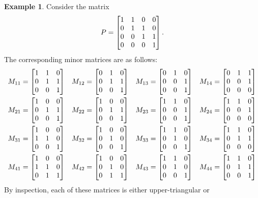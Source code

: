 \documentclass[reqno]{amsart}
\theoremstyle{definition}
\newtheorem{example}[theorem]{Example}
\begin{document}
\begin{example}\label{eg-adjugate-jordan}
 Consider the matrix
 \[ P = \left[\begin{matrix} 1&1&0&0 \\ 0&1&1&0 \\ 0&0&1&1 \\ 0&0&0&1 \end{matrix}\right]. \]
 The corresponding minor matrices are as follows:
 \begin{align*}
  M_{11} &= \left[\begin{matrix} 1&1&0\\ 0&1&1 \\ 0&0&1 \end{matrix}\right] &
  M_{12} &= \left[\begin{matrix} 0&1&0\\ 0&1&1 \\ 0&0&1 \end{matrix}\right] &
  M_{13} &= \left[\begin{matrix} 0&1&0\\ 0&0&1 \\ 0&0&1 \end{matrix}\right] &
  M_{14} &= \left[\begin{matrix} 0&1&1\\ 0&0&1 \\ 0&0&0 \end{matrix}\right] \\
  M_{21} &= \left[\begin{matrix} 1&0&0\\ 0&1&1 \\ 0&0&1 \end{matrix}\right] &
  M_{22} &= \left[\begin{matrix} 1&0&0\\ 0&1&1 \\ 0&0&1 \end{matrix}\right] &
  M_{23} &= \left[\begin{matrix} 1&1&0\\ 0&0&1 \\ 0&0&1 \end{matrix}\right] &
  M_{24} &= \left[\begin{matrix} 1&1&0\\ 0&0&1 \\ 0&0&0 \end{matrix}\right] \\
  M_{31} &= \left[\begin{matrix} 1&0&0\\ 1&1&0 \\ 0&0&1 \end{matrix}\right] &
  M_{32} &= \left[\begin{matrix} 1&0&0\\ 0&1&0 \\ 0&0&1 \end{matrix}\right] &
  M_{33} &= \left[\begin{matrix} 1&1&0\\ 0&1&0 \\ 0&0&1 \end{matrix}\right] &
  M_{34} &= \left[\begin{matrix} 1&1&0\\ 0&1&1 \\ 0&0&0 \end{matrix}\right] \\
  M_{41} &= \left[\begin{matrix} 1&0&0\\ 1&1&0 \\ 0&1&1 \end{matrix}\right] &
  M_{42} &= \left[\begin{matrix} 1&0&0\\ 0&1&0 \\ 0&1&1 \end{matrix}\right] &
  M_{43} &= \left[\begin{matrix} 1&1&0\\ 0&1&0 \\ 0&0&1 \end{matrix}\right] &
  M_{44} &= \left[\begin{matrix} 1&1&0\\ 0&1&1 \\ 0&0&1 \end{matrix}\right]
 \end{align*}
 By inspection, each of these matrices is either upper-triangular or

\end{example}
\end{document}
